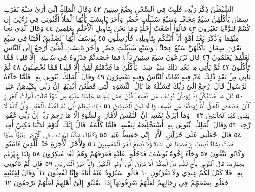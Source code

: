 ٱلشَّيْطَٰنُ ذِكْرَ رَبِّهِۦ فَلَبِثَ فِي ٱلسِّجْنِ بِضْعَ سِنِينَ ٤٢
وَقَالَ ٱلْمَلِكُ إِنِّيٓ أَرَىٰ سَبْعَ بَقَرَٰتࣲ سِمَانࣲ يَأْكُلُهُنَّ
سَبْعٌ عِجَافࣱ وَسَبْعَ سُنۢبُلَٰتٍ خُضْرࣲ وَأُخَرَ يَابِسَٰتࣲۖ يَٰٓأَيُّهَا
ٱلْمَلَأُ أَفْتُونِي فِي رُءْيَٰيَ إِن كُنتُمْ لِلرُّءْيَا تَعْبُرُونَ ٤٣
قَالُوٓا۟ أَضْغَٰثُ أَحْلَٰمࣲۖ وَمَا نَحْنُ بِتَأْوِيلِ ٱلْأَحْلَٰمِ بِعَٰلِمِينَ ٤٤
وَقَالَ ٱلَّذِي نَجَا مِنْهُمَا وَٱدَّكَرَ بَعْدَ أُمَّةٍ أَنَا۠ أُنَبِّئُكُم بِتَأْوِيلِهِۦ
فَأَرْسِلُونِ ٤٥ يُوسُفُ أَيُّهَا ٱلصِّدِّيقُ أَفْتِنَا فِي سَبْعِ بَقَرَٰتࣲ
سِمَانࣲ يَأْكُلُهُنَّ سَبْعٌ عِجَافࣱ وَسَبْعِ سُنۢبُلَٰتٍ خُضْرࣲ
وَأُخَرَ يَابِسَٰتࣲ لَّعَلِّيٓ أَرْجِعُ إِلَى ٱلنَّاسِ لَعَلَّهُمْ يَعْلَمُونَ ٤٦ قَالَ
تَزْرَعُونَ سَبْعَ سِنِينَ دَأَبࣰا فَمَا حَصَدتُّمْ فَذَرُوهُ فِي سُنۢبُلِهِۦٓ إِلَّا
قَلِيلࣰا مِّمَّا تَأْكُلُونَ ٤٧ ثُمَّ يَأْتِي مِنۢ بَعْدِ ذَٰلِكَ سَبْعࣱ شِدَادࣱ يَأْكُلْنَ
مَا قَدَّمْتُمْ لَهُنَّ إِلَّا قَلِيلࣰا مِّمَّا تُحْصِنُونَ ٤٨ ثُمَّ يَأْتِي مِنۢ بَعْدِ ذَٰلِكَ
عَامࣱ فِيهِ يُغَاثُ ٱلنَّاسُ وَفِيهِ يَعْصِرُونَ ٤٩ وَقَالَ ٱلْمَلِكُ ٱئْتُونِي
بِهِۦۖ فَلَمَّا جَآءَهُ ٱلرَّسُولُ قَالَ ٱرْجِعْ إِلَىٰ رَبِّكَ فَسْـَٔلْهُ مَا بَالُ
ٱلنِّسْوَةِ ٱلَّٰتِي قَطَّعْنَ أَيْدِيَهُنَّۚ إِنَّ رَبِّي بِكَيْدِهِنَّ عَلِيمࣱ ٥٠
قَالَ مَا خَطْبُكُنَّ إِذْ رَٰوَدتُّنَّ يُوسُفَ عَن نَّفْسِهِۦۚ قُلْنَ حَٰشَ
لِلَّهِ مَا عَلِمْنَا عَلَيْهِ مِن سُوٓءࣲۚ قَالَتِ ٱمْرَأَتُ ٱلْعَزِيزِ ٱلْـَٰٔنَ حَصْحَصَ
ٱلْحَقُّ أَنَا۠ رَٰوَدتُّهُۥ عَن نَّفْسِهِۦ وَإِنَّهُۥ لَمِنَ ٱلصَّٰدِقِينَ ٥١ ذَٰلِكَ
لِيَعْلَمَ أَنِّي لَمْ أَخُنْهُ بِٱلْغَيْبِ وَأَنَّ ٱللَّهَ لَا يَهْدِي كَيْدَ ٱلْخَآئِنِينَ ٥٢
۞ وَمَآ أُبَرِّئُ نَفْسِيٓۚ إِنَّ ٱلنَّفْسَ لَأَمَّارَةُۢ بِٱلسُّوٓءِ إِلَّا مَا رَحِمَ رَبِّيٓۚ
إِنَّ رَبِّي غَفُورࣱ رَّحِيمࣱ ٥٣ وَقَالَ ٱلْمَلِكُ ٱئْتُونِي بِهِۦٓ أَسْتَخْلِصْهُ
لِنَفْسِيۖ فَلَمَّا كَلَّمَهُۥ قَالَ إِنَّكَ ٱلْيَوْمَ لَدَيْنَا مَكِينٌ أَمِينࣱ ٥٤
قَالَ ٱجْعَلْنِي عَلَىٰ خَزَآئِنِ ٱلْأَرْضِۖ إِنِّي حَفِيظٌ عَلِيمࣱ ٥٥ وَكَذَٰلِكَ
مَكَّنَّا لِيُوسُفَ فِي ٱلْأَرْضِ يَتَبَوَّأُ مِنْهَا حَيْثُ يَشَآءُۚ نُصِيبُ
بِرَحْمَتِنَا مَن نَّشَآءُۖ وَلَا نُضِيعُ أَجْرَ ٱلْمُحْسِنِينَ ٥٦ وَلَأَجْرُ
ٱلْأٓخِرَةِ خَيْرࣱ لِّلَّذِينَ ءَامَنُوا۟ وَكَانُوا۟ يَتَّقُونَ ٥٧ وَجَآءَ
إِخْوَةُ يُوسُفَ فَدَخَلُوا۟ عَلَيْهِ فَعَرَفَهُمْ وَهُمْ لَهُۥ مُنكِرُونَ ٥٨
وَلَمَّا جَهَّزَهُم بِجَهَازِهِمْ قَالَ ٱئْتُونِي بِأَخࣲ لَّكُم مِّنْ أَبِيكُمْۚ أَلَا
تَرَوْنَ أَنِّيٓ أُوفِي ٱلْكَيْلَ وَأَنَا۠ خَيْرُ ٱلْمُنزِلِينَ ٥٩ فَإِن لَّمْ تَأْتُونِي
بِهِۦ فَلَا كَيْلَ لَكُمْ عِندِي وَلَا تَقْرَبُونِ ٦٠ قَالُوا۟ سَنُرَٰوِدُ عَنْهُ أَبَاهُ
وَإِنَّا لَفَٰعِلُونَ ٦١ وَقَالَ لِفِتْيَٰنِهِ ٱجْعَلُوا۟ بِضَٰعَتَهُمْ فِي رِحَالِهِمْ
لَعَلَّهُمْ يَعْرِفُونَهَآ إِذَا ٱنقَلَبُوٓا۟ إِلَىٰٓ أَهْلِهِمْ لَعَلَّهُمْ يَرْجِعُونَ ٦٢
